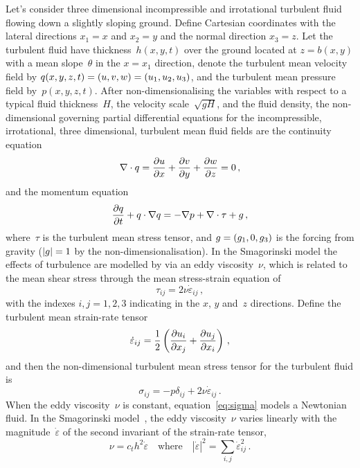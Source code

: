 \documentclass[twocolumn]{afmc_art}
\newcommand{\ros}{{\dot\varepsilon}}
\renewcommand{\vec}[1]{\text{\boldmath$#1$}}
\begin{document}
Let's consider three dimensional incompressible and irrotational turbulent fluid flowing down a slightly sloping ground. 
Define Cartesian coordinates with the lateral directions $x_1=x$ and $x_2=y$ and the normal direction $x_3=z$. 
Let the turbulent fluid have thickness~$h(x,y,t)$ over the ground located at $z=b(x,y)$ with a mean slope~$\theta$ in the $x=x_1$ direction, denote the turbulent mean velocity field by $\vec q(x,y,z,t)=(u,v,w)=(u_1,u_2,u_3)$, and the turbulent mean pressure field by~$p(x,y,z,t)$.
After non-dimensionalising the variables with respect to a typical fluid thickness~$H$, the velocity scale~$\sqrt{gH}$, and the  fluid density, the non-dimensional governing partial differential equations for the incompressible, irrotational, three dimensional, turbulent mean fluid fields are the continuity equation
\begin{equation}
    \divv\vec q=\D xu+\D yv+\D zw=0\,,\label{eq:cont}
\end{equation}
and the momentum equation
\begin{equation}
    \D t{\vec q} +\vec q\cdot\grad\vec q
    =-\grad p +\divv\tau +\vec{g}\,,\label{eq:mom}
\end{equation}
where~$\tau$ is the turbulent mean stress tensor, and $\vec g=(g_1,0,g_3)$ is the forcing from gravity ($|\vec g|=1$ by the non-dimensionalisation).
In the Smagorinski model the effects of turbulence are modelled by via an eddy viscosity~$\nu$, which is related to the mean shear stress through the mean stress-strain equation of
\begin{equation}
\tau_{ij}=2\nu\ros_{ij}\,,\label{eq:tau}
\end{equation}
with the indexes $i,j=1,2,3$ indicating in the $x$, $y$ and~$z$ directions.
Define the turbulent mean strain-rate tensor~\cite[e.g.]{Roberts2008,Georgiev2008}
\begin{equation}
	\ros_{ij} =\frac12\left( \D{x_j}{u_i} +\D{x_i}{u_j}\right) \,,\label{eq:strainrate}
\end{equation}
and then the non-dimensional turbulent mean stress tensor for the turbulent fluid is
\begin{equation}
\sigma_{ij}=-p\delta_{ij}+2\nu\ros_{ij}\,.\label{eq:sigma}
\end{equation}
When the eddy viscosity~$\nu$ is constant, equation~\eqref{eq:sigma} models a Newtonian fluid.
In the Smagorinski model~\cite[e.g.]{Ozgokmen2007a}, the eddy viscosity~$\nu$ varies linearly with the magnitude~$\ros$ of the second invariant of the strain-rate tensor,
\begin{equation}
  \nu=c_th^2\ros\quad\text{where}\quad |\ros|^2=\sum_{i,j}\ros_{ij}^2\,.\label{eq:nu}
\end{equation}
\end{document}
